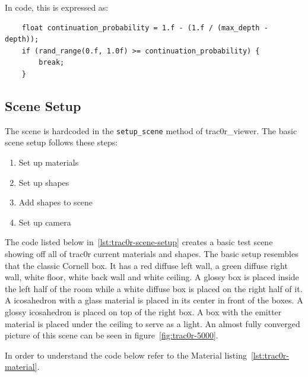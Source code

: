\documentclass[
  twoside,
  11pt, a4paper,
  footinclude=true,
  headinclude=true,
  cleardoublepage=empty
]{scrreprt}
\begin{document}
In code, this is expressed as:

\begin{verbatim}
    float continuation_probability = 1.f - (1.f / (max_depth - depth));
    if (rand_range(0.f, 1.0f) >= continuation_probability) {
        break;
    }
\end{verbatim}

\subsection{Scene Setup}
The scene is hardcoded in the \texttt{setup\_scene} method of trac0r\_viewer. The basic scene setup
follows these steps:

\begin{enumerate}
    \item Set up materials
    \item Set up shapes
    \item Add shapes to scene
    \item Set up camera
\end{enumerate}

The code listed below in~\ref{lst:trac0r-scene-setup} creates a basic test scene showing off all of
trac0r current materials and shapes. The basic setup resembles that the classic Cornell box. It has
a red diffuse left wall, a green diffuse right wall, white floor, white back wall and white ceiling.
A glossy box is placed inside the left half of the room while a white diffuse box is placed on the
right half of it. A icosahedron with a glass material is placed in its center in front of the
boxes. A glossy icosahedron is placed on top of the right box. A box with the emitter material is
placed under the ceiling to serve as a light. An almost fully converged picture of this scene can
be seen in figure~\ref{fig:trac0r-5000}.

In order to understand the code below refer to the Material listing~\ref{lst:trac0r-material}.
\end{document}
